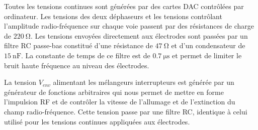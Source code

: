 Toutes les tensions continues sont générées par des cartes DAC contrôlées par ordinateur.
Les tensions des deux déphaseurs et les tensions contrôlant l'amplitude radio-fréquence sur chaque voie passent par des résistances de charge de $\SI{220}{\ohm}$.
Les tensions envoyées directement aux électrodes sont passées par un filtre RC passe-bas constitué d'une résistance de $\SI{47}{\ohm}$ et d'un condensateur de $\SI{15}{\nano\farad}$.
La constante de temps de ce filtre est de $\SI{0.7}{\us}$ et permet de limiter le bruit haute fréquence au niveau des électrodes.%

La tension $V_{env}$ alimentant les mélangeurs \og interrupteurs \fg{} est générée par un générateur de fonctions arbitraires qui nous permet de mettre en forme l'impulsion RF et de contrôler la vitesse de l'allumage et de l'extinction du champ radio-fréquence.
Cette tension passe par une filtre RC, identique à celui utilisé pour les tensions continues appliquées aux électrodes.

\clearpage
